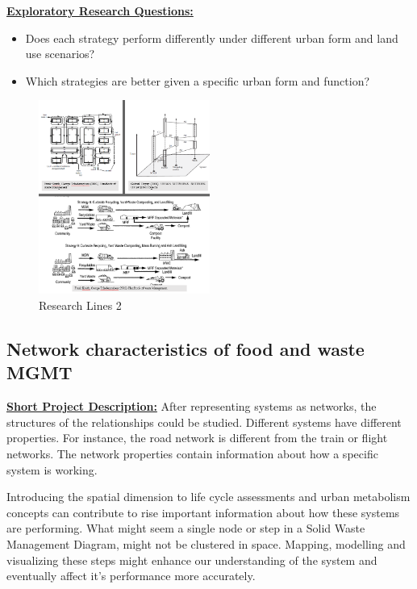 \textbf{\underline {Exploratory Research Questions: }} 
\begin{itemize}
    \item 	Does each strategy perform differently under different urban form and land use scenarios?
    \item 	Which strategies are better given a specific urban form and function?
\end{itemize}


\begin{figure}[hbt!]
    \centering
    \includegraphics[width=0.5\textwidth]{Imgs/rl_2.PNG}
    \caption{Research Lines 2}
    \label{fig:rl2}
\end{figure}






\subsection{Network characteristics of food and waste MGMT}
\textbf{\underline {Short Project Description:}} After representing systems as networks, the structures of the relationships could be studied. Different systems have different properties. For instance, the road network is different from the train or flight networks. The network properties contain information about how a specific system is working.  \par

Introducing the spatial dimension to life cycle assessments and urban metabolism concepts can contribute to rise important information about how these systems are performing. What might seem a single node or step in a Solid Waste Management Diagram, might not be clustered in space. Mapping, modelling and visualizing these steps might enhance our understanding of the system and eventually affect it’s performance more accurately.  \par


